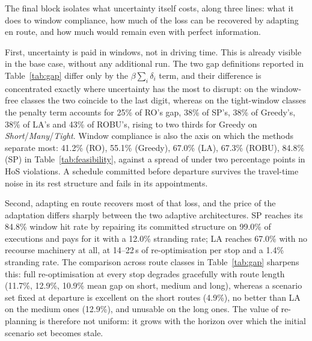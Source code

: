 The final block isolates what uncertainty itself costs, along three lines: what
it does to window compliance, how much of the loss can be recovered by adapting
en route, and how much would remain even with perfect information.

First, uncertainty is paid in windows, not in driving time.  This is already
visible in the base case, without any additional run.  The two gap definitions
reported in Table~\ref{tab:gap} differ only by the
$\beta\sum_i\delta_i$ term, and their difference is concentrated exactly where
uncertainty has the most to disrupt: on the window-free classes the two coincide
to the last digit, whereas on the tight-window classes the penalty term accounts
for 25\% of RO's gap, 38\% of SP's, 38\% of Greedy's, 38\% of LA's and 43\% of
ROBU's, rising to two thirds for Greedy on
\emph{Short}/\emph{Many}/\emph{Tight}.  Window compliance is also the axis on
which the methods separate most: 41.2\% (RO), 55.1\% (Greedy), 67.0\% (LA),
67.3\% (ROBU), 84.8\% (SP) in Table~\ref{tab:feasibility}, against a spread of
under two percentage points in HoS violations.  A schedule committed before
departure survives the travel-time noise in its rest structure and fails in its
appointments.

Second, adapting en route recovers most of that loss, and the price of the
adaptation differs sharply between the two adaptive architectures.  SP reaches
its 84.8\% window hit rate by repairing its committed structure on 99.0\% of
executions and pays for it with a 12.0\% stranding rate; LA reaches 67.0\% with
no recourse machinery at all, at 14--22\,s of re-optimisation per stop and a
1.4\% stranding rate.  The comparison across route classes in
Table~\ref{tab:gap} sharpens this: full re-optimisation at every stop degrades
gracefully with route length (11.7\%, 12.9\%, 10.9\% mean gap on short, medium
and long), whereas a scenario set fixed at departure is excellent on the short
routes (4.9\%), no better than LA on the medium ones (12.9\%), and unusable on
the long ones.  The value of re-planning is therefore not uniform: it grows with
the horizon over which the initial scenario set becomes stale.

